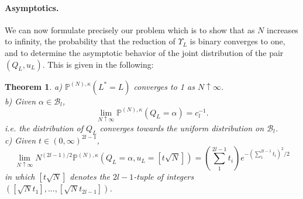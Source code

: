 \documentclass[11pt]{article}
\newtheorem{theorem}{Theorem}[section]
\begin{document}
\paragraph {Asymptotics.}We can now formulate precisely our problem which is to show that as $N$ increases to infinity, the probability that the reduction  of $\Upsilon_L$ is binary converges to one, and to determine the asymptotic behavior of the joint distribution of the pair $(Q_L,u_L)$. This is given in the following:


\begin{theorem}\label{blu}
a) $ \mathbb P^{(N),\kappa}( L^*=L)$ converges to 1 as $N\uparrow \infty$.\\
b) Given $\alpha \in \mathcal B_l$, $$\lim_{N\uparrow \infty} \mathbb P ^{(N),\kappa} (Q_L=\alpha)=c_l^{-1}.$$
 i.e. the distribution of $Q_L$ converges towards the uniform distribution on $\mathcal B_l$.\\
c) Given $t\in  (0,\infty)^{2l-1}$, $$\lim_{N\uparrow \infty}N^{(2l-1)/2} \mathbb P^{(N),\kappa} (Q_L=\alpha, u_L=[t\sqrt N])=(\sum_1^{2l-1}t_i)e^{-(\sum_1^{2l-1}t_i)^2/2}$$ in which $[t\sqrt N]$ denotes the $2l-1$-tuple of integers
 $([\sqrt N t_1],...,[\sqrt N t_{2l-1}])$.\\
\end{theorem}
\end{document}
